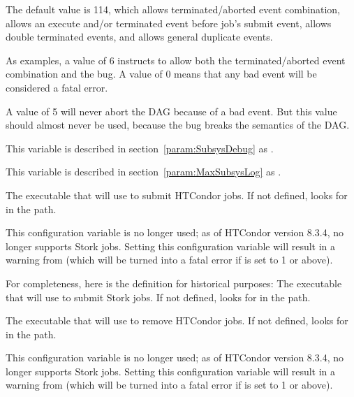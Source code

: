 \begin{description}
  The default value is 114, which allows terminated/aborted event combination,
  allows an execute and/or terminated event before job's submit event,
  allows double terminated events, and allows general duplicate events.

  As examples, a value of 6 instructs  to allow both
  the terminated/aborted event combination and the 
   bug.
  A value of 0 means that any bad event will be considered a fatal error.

  A value of 5 will never abort the DAG because of a bad event.
  But this value should almost never be used,
  because the  
  bug breaks the semantics of the DAG.

\label{param:DAGManDebug}
\item[\Macro{DAGMAN\_DEBUG}]
  This variable is described in section~\ref{param:SubsysDebug} as
  .

\label{Param:MaxDAGManLog}
\item[\Macro{MAX\_DAGMAN\_LOG}]
  This variable is described in section~\ref{param:MaxSubsysLog} as
  .

\label{param:DAGManCondorSubmitExe}
\item[\Macro{DAGMAN\_CONDOR\_SUBMIT\_EXE}]
  The executable that  will use to submit HTCondor jobs.
  If not defined,  looks for  in the path.

\label{param:DAGManStorkSubmitExe}
\item[\Macro{DAGMAN\_STORK\_SUBMIT\_EXE}]
  This configuration variable is no longer used; 
  as of HTCondor version 8.3.4,  no longer supports Stork jobs.
  Setting this configuration variable will result in a warning
  from  (which will be turned into a fatal error
  if  is set to 1 or above).

  For completeness, here is the definition for historical purposes: 
  The executable that  will use to submit Stork jobs.
  If not defined,  looks for  in the path.

\label{param:DAGManCondorRmExe}
\item[\Macro{DAGMAN\_CONDOR\_RM\_EXE}]
  The executable that  will use to remove HTCondor jobs.
  If not defined,  looks for  in the path.

\label{param:DAGManStorkRmExe}
\item[\Macro{DAGMAN\_STORK\_RM\_EXE}]
  This configuration variable is no longer used; 
  as of HTCondor version 8.3.4,  no longer supports Stork jobs.
  Setting this configuration variable will result in a warning
  from  (which will be turned into a fatal error
  if  is set to 1 or above).


\end{description}

